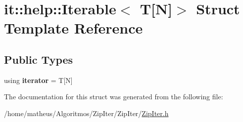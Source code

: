 \hypertarget{structit_1_1help_1_1Iterable_3_01T[N]_4}{}\section{it\+:\+:help\+:\+:Iterable$<$ T\mbox{[}N\mbox{]}$>$ Struct Template Reference}
\label{structit_1_1help_1_1Iterable_3_01T[N]_4}
\subsection*{Public Types}
\begin{DoxyCompactItemize}
\item 
using {\bfseries iterator} = T\mbox{[}N\mbox{]}\hypertarget{structit_1_1help_1_1Iterable_3_01T[N]_4_a5d9c8ffaa4c2f97f3d7d35a3039d9db0}{}\label{structit_1_1help_1_1Iterable_3_01T[N]_4_a5d9c8ffaa4c2f97f3d7d35a3039d9db0}

\end{DoxyCompactItemize}


The documentation for this struct was generated from the following file\+:\begin{DoxyCompactItemize}
\item 
/home/matheus/\+Algoritmos/\+Zip\+Iter/\+Zip\+Iter/\hyperlink{ZipIter_8h}{Zip\+Iter.\+h}\end{DoxyCompactItemize}
